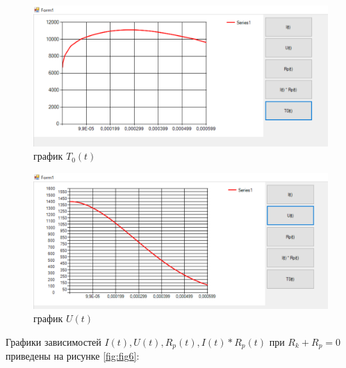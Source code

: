 \newpage

\begin{figure}[ht!]
  \centering
  \includegraphics[scale=0.8]{img/T0(t).png}
  \caption{график $T_0(t)$}
  \label{fig:fig4}
\end{figure}

\begin{figure}[ht!]
  \centering
  \includegraphics[scale=0.8]{img/U(t).png}
  \caption{график $U(t)$}
  \label{fig:fig5}
\end{figure}

\newpage

Графики зависимостей $I(t),U(t),R_p(t),I(t)*R_p(t)$ при $R_k+R_p=0$ приведены на рисунке \ref{fig:fig6}:

